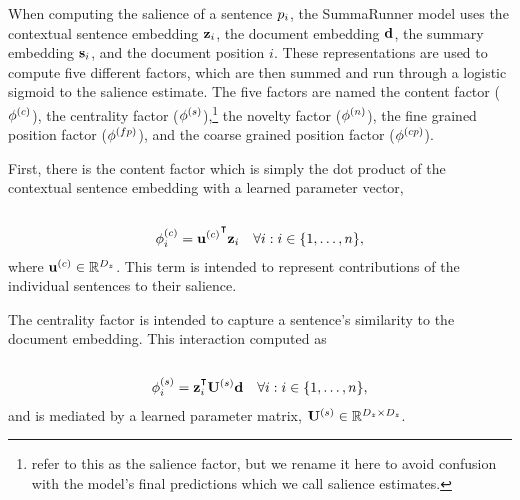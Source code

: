 

When computing the salience of a sentence $p_i$, the SummaRunner model
uses the contextual sentence embedding $\mathbf{z}_i$, the document embedding
$\mathbf{d}$, the summary embedding $\mathbf{s}_i$, and the document position $i$.
These representations are used to compute five different factors, which are
then summed and run through a logistic sigmoid to the salience estimate.  The
five factors are named the content factor ($\phi^{(c)}$), the centrality
factor ($\phi^{(s)}$),\footnote{\citet{nallapati2017summarunner} refer
to this as the salience factor, but we rename it here to avoid confusion with
the model's final predictions which we call salience estimates.} the novelty
factor ($\phi^{(n)}$), the fine grained position factor
($\phi^{(fp)}$), and the coarse grained position factor
($\phi^{(cp)}$).

First, there is the content factor which is simply the dot product of the
contextual sentence embedding with a learned parameter vector,\\

\\[-40pt]
\begin{align}
    \srContentFactor_i &={\srContentWeight}^\T \srHid_i & \forall i : i \in \{1,\ldots,\docSize\}, 
\end{align}
where $\mathbf{u}^{(c)} \in \mathbb{R}^{{D_z}}$. This term is intended to
represent contributions of the individual sentences to their salience.

The centrality factor is intended to capture a sentence's similarity to the
document embedding. This interaction computed as\\

\\[-40pt]
\begin{align}
    \srSalienceFactor_i & = \srHid_i^\T\srSalienceWeight \srDocEmb & \forall i : i \in \{1,\ldots,\docSize\}, 
\end{align}
and is mediated by a learned parameter matrix, $\mathbf{U}^{(s)} \in \mathbb{R}^{{D_z} \times {D_z}}$.

